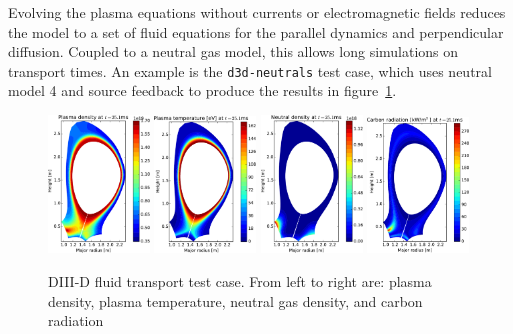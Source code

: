 \documentclass[12pt,a4paper]{article}
\begin{document}
Evolving the plasma equations without currents or electromagnetic fields reduces the model
to a set of fluid equations for the parallel dynamics and perpendicular diffusion. Coupled
to a neutral gas model, this allows long simulations on transport times. An example
is the \texttt{d3d-neutrals} test case, which uses neutral model 4 and source
feedback to produce the results in figure~\ref{fig:neutrals-d3d}.
\begin{figure}[h]
\centering
\includegraphics[width=0.24\textwidth]{figs/DIII-D/plasma_density.pdf}
\includegraphics[width=0.24\textwidth]{figs/DIII-D/plasma_temperature.pdf}
\includegraphics[width=0.24\textwidth]{figs/DIII-D/neutral_density.pdf}
\includegraphics[width=0.24\textwidth]{figs/DIII-D/carbon_radiation.pdf}
\caption{DIII-D fluid transport test case. From left to right are: plasma density, plasma temperature, neutral gas density, and carbon radiation}
\label{fig:neutrals-d3d}
\end{figure}
\end{document}
